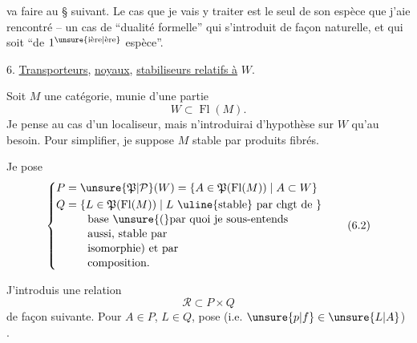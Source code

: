 va faire au § suivant. Le cas que je vais y
traiter est le seul de son espèce que j'aie
rencontré -- un cas de ``dualité formelle'' qui
s'introduit de façon naturelle, et qui
 soit ``de $1^{\text{\unsure{ière|ère}}}$ espèce''.

6. \uline{Transporteurs}, \uline{noyaux}, \uline{stabiliseurs relatifs à} $W$.

Soit $M$ une catégorie, munie d'une partie
\[
W\subset\operatorname{Fl}(M).\tag*{(6.1)}
\]
Je pense au cas d'un localiseur, mais n'introduirai d'hypothèse sur $W$ qu'au besoin.
Pour simplifier, je suppose $M$ stable
par produits fibrés.

Je pose 
\[
\left\{\begin{aligned}
P&=\unsure{\mathfrak{P}|\mathcal{P}}(W)=\{A\in\mathfrak{P}(\operatorname{Fl}(M))\mid A\subset W\}\\
Q&=\{L\in\mathfrak{P}(\operatorname{Fl}(M))\mid L\ \text{\uline{stable} par chgt de}\ \}\\[-2pt]
 &\qquad\text{base }\unsure{(}\text{par quoi je sous-entends}\\[-2pt]
 &\qquad\text{aussi, stable par}\\[-2pt]
 &\qquad\text{isomorphie) et par}\\[-2pt]
 &\qquad\text{composition}.
\end{aligned}\right.\tag*{(6.2)}
\]

J'introduis une relation
\[
\mathcal{R}\subset P\times Q
\]
de  façon suivante. Pour $A\in P$, $L\in Q$,
 pose
(i.e. 
  $\unsure{p|f}\in\unsure{L|A}$)
.
